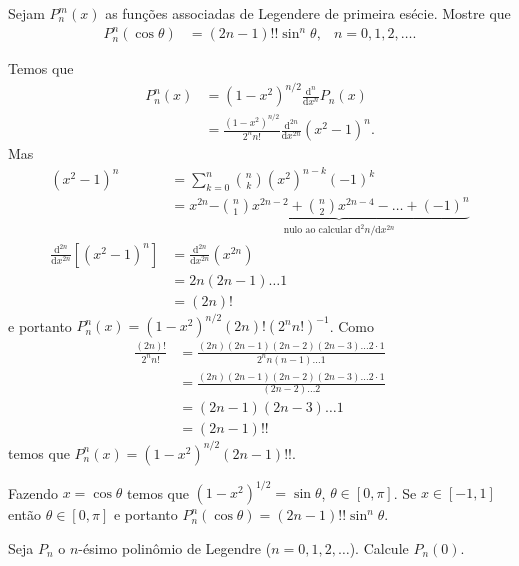 \documentclass[a4paper,12pt, leqno, answers]{exam}
\begin{document}
\begin{questions}
    \question Sejam $P_n^m(x)$ as fun\c{c}\~{o}es associadas de Legendere de primeira es\'{e}cie. Mostre que
    \begin{align*}
        P_n^n(\cos \theta) &= \left( 2n - 1 \right)!! \sin^n \theta, & n = 0, 1, 2, \ldots.
    \end{align*}
    \begin{solution}
        Temos que
        \begin{align*}
            P_n^n(x) &= (1 - x^2)^{n / 2} \frac{\mathrm{d}^n}{\mathrm{d}x^n} P_n(x) \\
            &= \frac{(1 - x^2)^{n / 2}}{2^n n!} \frac{\mathrm{d}^{2n}}{\mathrm{d}x^{2n}} (x^2 - 1)^n.
        \end{align*}
        Mas
        \begin{align*}
            (x^2 - 1)^n &= \sum_{k = 0}^n \binom{n}{k} (x^2)^{n - k} (-1)^k \\
            &= x^{2n} \underbrace{- \binom{n}{1} x^{2n - 2} + \binom{n}{2} x^{2n - 4} - \ldots + (-1)^n}_{\text{nulo ao calcular $\mathrm{d}^2n/\mathrm{d}x^{2n}$}} \\
            \frac{\mathrm{d} ^{2n}}{\mathrm{d}x^{2n}} \left[ \left( x^2 - 1 \right)^n \right] &= \frac{\mathrm{d}^{2n}}{\mathrm{d}x^{2n}} \left( x^{2n} \right) \\
            &= 2n (2n - 1) \ldots 1 \\
            &= (2n)!
        \end{align*}
        e portanto $P_n^n(x) = \left( 1 - x^2 \right)^{n / 2} (2n)! \left( 2^n n! \right)^{-1}$.
        Como
        \begin{align*}
            \frac{(2n)!}{2^n n!} &= \frac{(2n) (2n - 1) (2n - 2) (2n - 3) \ldots 2 \cdot 1}{2^n n (n - 1) \ldots 1} \\
            &= \frac{(2n) (2n - 1) (2n - 2) (2n - 3) \ldots 2 \cdot 1}{(2n - 2) \ldots 2} \\
            &= (2n - 1) (2n - 3) \ldots 1 \\
            &= (2n - 1)!!
        \end{align*}
        temos que $P_n^n(x) = \left( 1 - x^2 \right)^{n / 2} (2n - 1)!!$.

        Fazendo $x = \cos \theta$ temos que $(1 - x^2)^{1/2} = \sin \theta$, $\theta \in [0, \pi]$. Se $x \in [-1, 1]$ ent\~{a}o $\theta \in [0, \pi]$ e portanto $P_n^n(\cos \theta) = (2n - 1)!! \sin^n \theta$.
    \end{solution}

    \question Seja $P_n$ o $n$-\'{e}simo polin\^{o}mio de Legendre ($n = 0, 1, 2, \ldots$). Calcule $P_n(0)$.
    \begin{solution}
        

\end{solution}
\end{questions}
\end{document}

